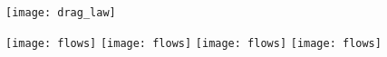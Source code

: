 \documentclass[border=3.141592, preview]{standalone}
\begin{document}
\begin{figure}
    \begin{center}
        \texttt{[image: drag\_law]}\\
    \end{center}
    \vspace{-4.5cm}
    \hspace{1.80cm}\texttt{[image: flows]}
    \hspace{0.82cm}\texttt{[image: flows]}
    \hspace{1.30cm}\texttt{[image: flows]}
    \hspace{1.30cm}\texttt{[image: flows]}
    \vspace{6cm}
\end{figure}
\end{document}
